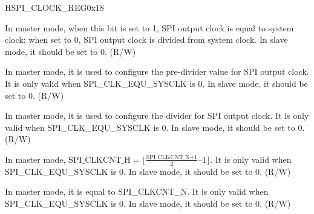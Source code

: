 \begin{register}{H}{SPI\_CLOCK\_REG}{0x18}\label{regdesc:SPICLOCKREG}
%
%
%
%
%
\regnewline%
\begin{regdesc}\begin{reglist}
\item [SPI\_CLK\_EQU\_SYSCLK]In master mode, when this bit is set to 1, SPI output clock is equal to system clock; when set to 0, SPI output clock is divided from system clock. In slave mode, it should be set to 0. (R/W)
\item [SPI\_CLKDIV\_PRE]In master mode, it is used to configure the pre-divider value for SPI output clock. It is only valid when SPI\_CLK\_EQU\_SYSCLK is 0. In slave mode, it should be set to 0. (R/W)
\item [SPI\_CLKCNT\_N]In master mode, it is used to configure the divider for SPI output clock. It is only valid when SPI\_CLK\_EQU\_SYSCLK is 0. In slave mode, it should be set to 0. (R/W)
\item [SPI\_CLKCNT\_H] In master mode, $\textrm{SPI\_CLKCNT\_H} =\lfloor \frac{\textrm{SPI\_CLKCNT\_N+1}}{2} – 1\rfloor$. It is only valid when SPI\_CLK\_EQU\_SYSCLK is 0. In slave mode, it should be set to 0. (R/W)
\item [SPI\_CLKCNT\_L]In master mode, it is equal to SPI\_CLKCNT\_N. It is only valid when SPI\_CLK\_EQU\_SYSCLK is 0. In slave mode, it should be set to 0. (R/W)
\end{reglist}\end{regdesc}
\end{register}


